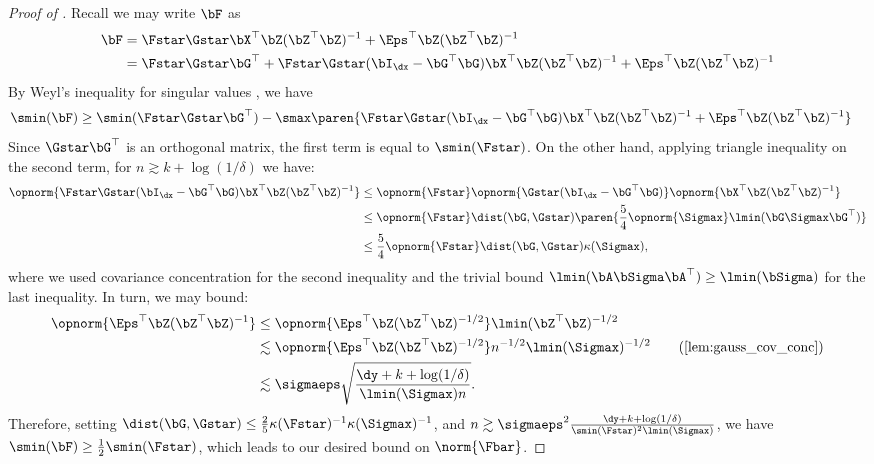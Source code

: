 \begin{proof}[Proof of ]
    Recall we may write $\bF$ as
    \begin{align}
        \bF &= \Fstar \Gstar \bX^\top \bZ (\bZ^\top \bZ)^{-1} + \Eps^\top \bZ (\bZ^\top \bZ)^{-1} \nonumber \\
        &= \Fstar \Gstar \bG^\top + \Fstar \Gstar (\bI_{\dx} - \bG^\top \bG) \bX^\top \bZ (\bZ^\top \bZ)^{-1} + \Eps^\top \bZ (\bZ^\top \bZ)^{-1}\label{eq:linrep_Fls_expanded}
    \end{align}
    By Weyl's inequality for singular values \cite{horn2012matrix}, we have
    \begin{align*}
        \smin(\bF) &\geq \smin(\Fstar \Gstar \bG^\top) - \smax\paren{\Fstar \Gstar (\bI_{\dx} - \bG^\top \bG) \bX^\top \bZ (\bZ^\top \bZ)^{-1} + \Eps^\top \bZ (\bZ^\top \bZ)^{-1}}
    \end{align*}
    Since $\Gstar \bG^\top$ is an orthogonal matrix, the first term is equal to $\smin(\Fstar)$. On the other hand, applying triangle inequality on the second term, for $n \gtrsim k + \log(1/\delta)$ we have:
    \begin{align*}
        \opnorm{\Fstar \Gstar (\bI_{\dx} - \bG^\top \bG) \bX^\top \bZ (\bZ^\top \bZ)^{-1}} &\leq \opnorm{\Fstar}\opnorm{\Gstar (\bI_{\dx} - \bG^\top \bG)}\opnorm{\bX^\top \bZ (\bZ^\top \bZ)^{-1}} \\
        &\leq \opnorm{\Fstar} \dist(\bG, \Gstar) \paren{\frac{5}{4} \opnorm{\Sigmax} \lmin(\bG \Sigmax \bG^\top)} \\
        &\leq \frac{5}{4}\opnorm{\Fstar} \dist(\bG, \Gstar) \kappa(\Sigmax),
    \end{align*}
    where we used covariance concentration for the second inequality  and the trivial bound $\lmin(\bA \bSigma \bA^\top) \geq \lmin(\bSigma)$ for the last inequality. In turn, we may bound:
    \begin{align*}
        \opnorm{\Eps^\top \bZ (\bZ^\top \bZ)^{-1}} &\leq \opnorm{\Eps^\top \bZ (\bZ^\top \bZ)^{-1/2}} \lmin(\bZ^\top \bZ)^{-1/2} \\
        &\lesssim \opnorm{\Eps^\top \bZ (\bZ^\top \bZ)^{-1/2}} n^{-1/2} \lmin(\Sigmax)^{-1/2} \tag{\Cref{lem:gauss_cov_conc}}\\
        &\lesssim \sigmaeps  \sqrt{\frac{\dy + k + \log(1/\delta)}{\lmin(\Sigmax) n}}.
    \end{align*}
    Therefore, setting $\dist(\bG, \Gstar) \leq \frac{2}{5} \kappa(\Fstar)^{-1} \kappa(\Sigmax)^{-1}$, and $n \gtrsim \sigmaeps^2 \frac{\dy + k + \log(1/\delta)}{\smin(\Fstar)^2\lmin(\Sigmax)}$, we have $\smin(\bF) \geq \frac{1}{2}\smin(\Fstar)$, which leads to our desired bound on $\norm{\Fbar}$.
\end{proof}

